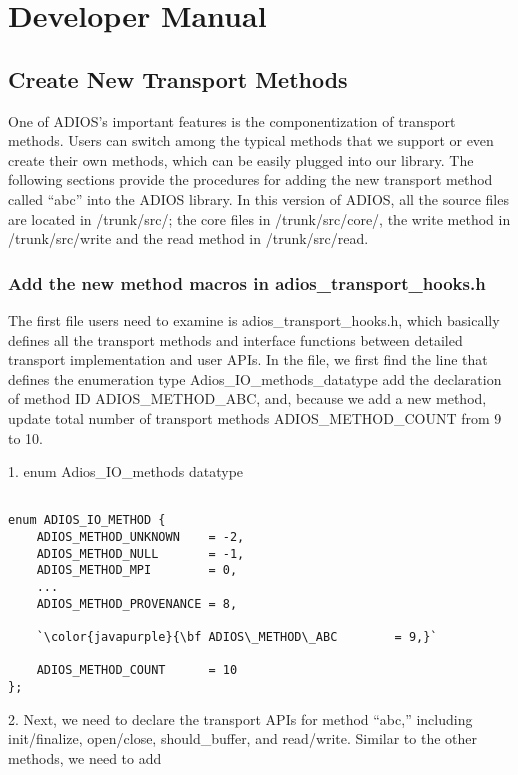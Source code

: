 \chapter{Developer Manual}

\section{Create New Transport Methods}

One of ADIOS's important features is the componentization of transport methods. 
Users can switch among the typical methods that we support or even create their 
own methods, which can be easily plugged into our library. The following sections 
provide the procedures for adding the new transport method called ``abc'' into 
the ADIOS library. In this version of ADIOS, all the source files are located in 
/trunk/src/; the core files in /trunk/src/core/, the write method in /trunk/src/write
and the read method in /trunk/src/read.

\subsection{Add the new method macros in adios\_transport\_hooks.h}

The first file users need to examine is adios\_transport\_hooks.h, which basically 
defines all the transport methods and interface functions between detailed transport 
implementation and user APIs. In the file, we first find the line that defines 
the enumeration type Adios\_IO\_methods\_datatype add the declaration of method 
ID ADIOS\_METHOD\_ABC, and, because we add a new method, update total number of 
transport methods ADIOS\_METHOD\_COUNT from 9 to 10.

1. enum Adios\_IO\_methods datatype 
\begin{lstlisting}[caption={Add a new write method, step 1}]

enum ADIOS_IO_METHOD {
    ADIOS_METHOD_UNKNOWN    = -2,
    ADIOS_METHOD_NULL       = -1,
    ADIOS_METHOD_MPI        = 0,
    ...
    ADIOS_METHOD_PROVENANCE = 8,

    `\color{javapurple}{\bf ADIOS\_METHOD\_ABC        = 9,}`

    ADIOS_METHOD_COUNT      = 10
};
\end{lstlisting}

2. Next, we need to declare the transport APIs for method ``abc,'' including init/finalize, 
open/close, should\_buffer, and read/write. Similar to the other methods, we need 
to add 

